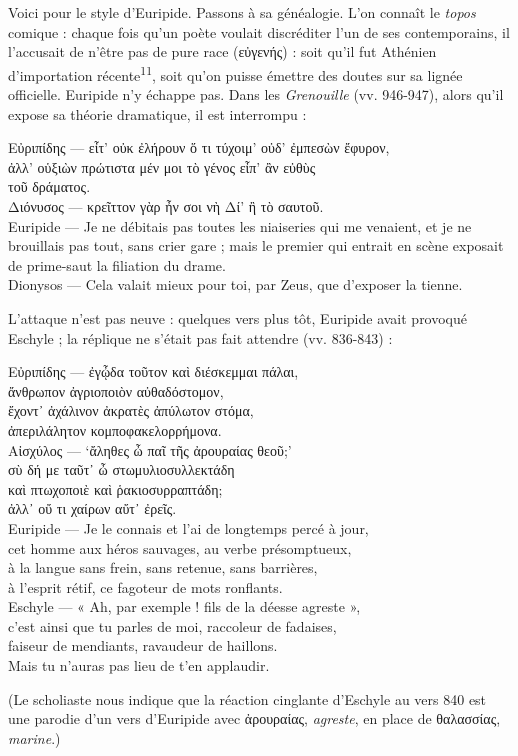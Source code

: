 \documentclass[12pt]{book}%
\newcommand{\italique}[1]{\textit{#1}}%
\newcommand{\citComm}[1]{\begin{quoting}[vskip=0pt] #1 \end{quoting}}%
\newcommand{\espace}[1]{\hspace{#1}}%
\newlength{\larg}%
\newcommand{\decalage}[1]{%
\settowidth{\larg}{#1}%
\espace{\larg}%
}
\newcommand{\marqueur}[1]{\textsuperscript{#1}}%
\newenvironment{groupe}{%
\pstart%
\ledgroup%
}{%
\pend %
}%
\begin{document}
\begin{pages}
\begin{Leftside}
\begin{groupe}
{{Voici pour le style d'Euripide. Passons à sa généalogie. L'on connaît le \italique{topos} comique : chaque fois qu'un poète voulait discréditer l'un de ses contemporains, il l'accusait de n'être pas de pure race (εὐγενής) : soit qu'il fut Athénien d'importation récente\marqueur{11}, soit qu'on puisse émettre des doutes sur sa lignée officielle. Euripide n'y échappe pas. Dans les \italique{Grenouille} (vv. 946-947), alors qu'il expose sa théorie dramatique, il est interrompu :%
\citComm{Εὐριπίδης --- εἶτ’ οὐκ ἐλήρουν ὅ τι τύχοιμ’ οὐδ’ ἐμπεσὼν ἔφυρον,\\
ἀλλ’ οὑξιὼν πρώτιστα μέν μοι τὸ γένος εἶπ’ ἂν εὐθὺς\\
τοῦ δράματος.\\
Διόνυσος --- \decalage{τοῦ }κρεῖττον γὰρ ἦν σοι νὴ Δί’ ἢ τὸ σαυτοῦ.\\
Euripide --- Je ne débitais pas toutes les niaiseries qui me venaient, et je ne brouillais pas tout, sans crier gare ;
mais le premier qui entrait en scène exposait de prime-saut la filiation du drame.\\
Dionysos --- Cela valait mieux pour toi, par Zeus, que d'exposer la tienne.}%
L'attaque n'est pas neuve : quelques vers plus tôt, Euripide avait provoqué Eschyle ; la réplique ne s'était pas fait attendre (vv. 836-843) :%
\citComm{Εὐριπίδης --- ἐγᾦδα τοῦτον καὶ διέσκεμμαι πάλαι,\\
ἄνθρωπον ἀγριοποιὸν αὐθαδόστομον,\\
ἔχοντ᾽ ἀχάλινον ἀκρατὲς ἀπύλωτον στόμα,\\
ἀπεριλάλητον κομποφακελορρήμονα.\\
Αἰσχύλος --- `ἄληθες ὦ παῖ τῆς ἀρουραίας θεοῦ;'\\
σὺ δή με ταῦτ᾽ ὦ στωμυλιοσυλλεκτάδη\\
καὶ πτωχοποιὲ καὶ ῥακιοσυρραπτάδη;\\
ἀλλ᾽ οὔ τι χαίρων αὔτ᾽ ἐρεῖς.\\
Euripide --- Je le connais et l'ai de longtemps percé à jour,\\
cet homme aux héros sauvages, au verbe présomptueux,\\
à la langue sans frein, sans retenue, sans barrières,\\
à l'esprit rétif, ce fagoteur de mots ronflants.\\
Eschyle --- « Ah, par exemple ! fils de la déesse agreste », \\
c'est ainsi que tu parles de moi, raccoleur de fadaises,\\
faiseur de mendiants, ravaudeur de haillons.\\
Mais tu n'auras pas lieu de t'en applaudir.}
(Le scholiaste nous indique que la réaction cinglante d'Eschyle au vers 840 est une parodie d'un vers d'Euripide avec ἀρουραίας, \italique{agreste}, en place de θαλασσίας, \italique{marine}.)



}}
\end{groupe}
\end{Leftside}
\end{pages}
\end{document}
